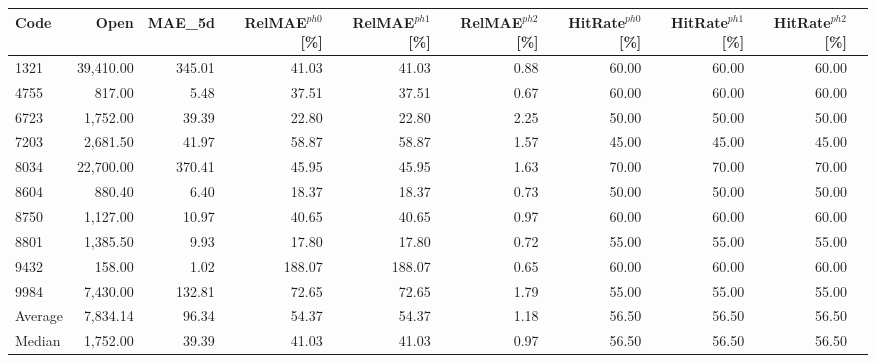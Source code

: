 \begingroup
\footnotesize
\begin{tabular}{lrrrrrrrrr}
\hline
Code & Open & MAE\_5d & RelMAE$^{ph0}$[\%] & RelMAE$^{ph1}$[\%] & RelMAE$^{ph2}$[\%] & HitRate$^{ph0}$[\%] & HitRate$^{ph1}$[\%] & HitRate$^{ph2}$[\%] \\
\hline
1321 & 39,410.00 & 345.01 & 41.03 & 41.03 & 0.88 & 60.00 & 60.00 & 60.00 \\
4755 & 817.00 & 5.48 & 37.51 & 37.51 & 0.67 & 60.00 & 60.00 & 60.00 \\
6723 & 1,752.00 & 39.39 & 22.80 & 22.80 & 2.25 & 50.00 & 50.00 & 50.00 \\
7203 & 2,681.50 & 41.97 & 58.87 & 58.87 & 1.57 & 45.00 & 45.00 & 45.00 \\
8034 & 22,700.00 & 370.41 & 45.95 & 45.95 & 1.63 & 70.00 & 70.00 & 70.00 \\
8604 & 880.40 & 6.40 & 18.37 & 18.37 & 0.73 & 50.00 & 50.00 & 50.00 \\
8750 & 1,127.00 & 10.97 & 40.65 & 40.65 & 0.97 & 60.00 & 60.00 & 60.00 \\
8801 & 1,385.50 & 9.93 & 17.80 & 17.80 & 0.72 & 55.00 & 55.00 & 55.00 \\
9432 & 158.00 & 1.02 & 188.07 & 188.07 & 0.65 & 60.00 & 60.00 & 60.00 \\
9984 & 7,430.00 & 132.81 & 72.65 & 72.65 & 1.79 & 55.00 & 55.00 & 55.00 \\
Average & 7,834.14 & 96.34 & 54.37 & 54.37 & 1.18 & 56.50 & 56.50 & 56.50 \\
Median & 1,752.00 & 39.39 & 41.03 & 41.03 & 0.97 & 56.50 & 56.50 & 56.50 \\
\hline
\end{tabular}
\endgroup